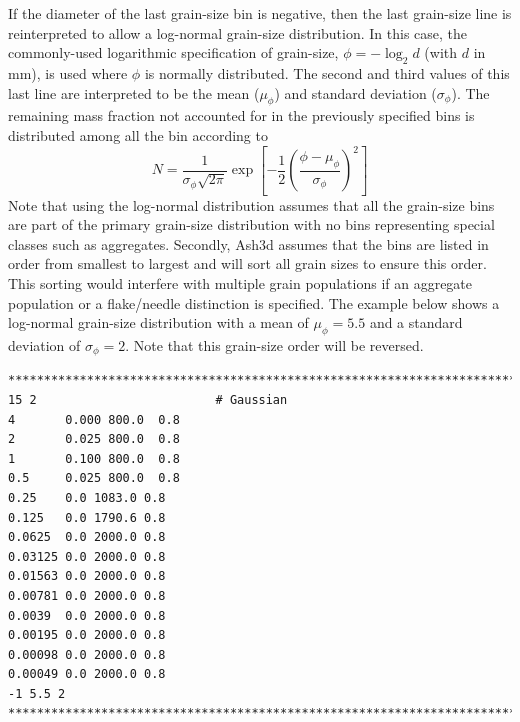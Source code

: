If the diameter of the last grain-size bin is negative, then the last grain-size line
is reinterpreted to allow a log-normal grain-size distribution.
In this case, the commonly-used logarithmic specification of grain-size,
$\phi=-\log_2 d$ (with $d$ in $\mathrm{mm}$), is used where $\phi$ is normally
distributed.
The second and third values of this last line
are interpreted to be the mean ($\mu_{\phi}$)
and standard deviation ($\sigma_{\phi}$).
The remaining mass fraction not accounted for in the previously specified
bins is distributed among all the bin according to 
\begin{equation}
N=\frac{1}{\sigma_{\phi} \sqrt{2 \pi}}
\exp{\left[-\frac{1}{2} \left(  \frac{\phi-\mu_{\phi}}{\sigma_{\phi}}  \right)^2 \right]}
\end{equation}
Note that using the log-normal distribution assumes that all the grain-size bins
are part of the primary grain-size distribution with no bins representing special
classes such as aggregates. Secondly, Ash3d assumes that the bins are listed in
order from smallest to largest and will sort all grain sizes to ensure this order.
This sorting would interfere with multiple grain populations if an aggregate
population or a flake/needle distinction is specified. The example below shows
a log-normal grain-size distribution with a mean of $\mu_{\phi}=5.5$ and a standard
deviation of $\sigma_{\phi}=2$. Note that this grain-size order will be reversed.
\small
\begin{verbatim}
*******************************************************************************
15 2                         # Gaussian
4       0.000 800.0  0.8
2       0.025 800.0  0.8
1       0.100 800.0  0.8
0.5     0.025 800.0  0.8
0.25    0.0 1083.0 0.8
0.125   0.0 1790.6 0.8
0.0625  0.0 2000.0 0.8
0.03125 0.0 2000.0 0.8
0.01563 0.0 2000.0 0.8
0.00781 0.0 2000.0 0.8
0.0039  0.0 2000.0 0.8
0.00195 0.0 2000.0 0.8
0.00098 0.0 2000.0 0.8
0.00049 0.0 2000.0 0.8
-1 5.5 2
*******************************************************************************
\end{verbatim}
\normalsize

